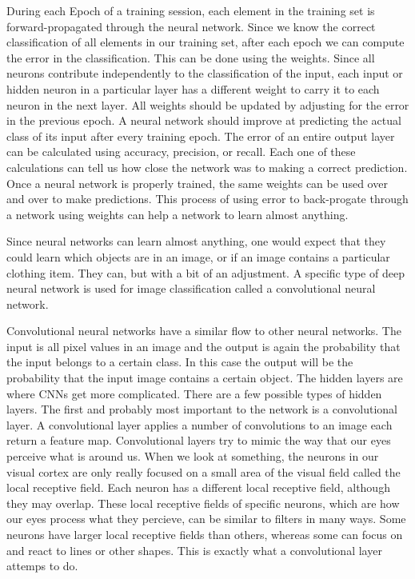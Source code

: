 \documentclass[12pt]{report} %
\begin{document}
	During each Epoch of a training session, each element in the training set is forward-propagated through the neural network. Since we know the correct classification of all elements in our training set, after each epoch we can compute the error in the classification. This can be done using the weights. Since all neurons contribute independently to the classification of the input, each input or hidden neuron in a particular layer has a different weight to carry it to each neuron in the next layer. All weights should be updated by adjusting for the error in the previous epoch. A neural network should improve at predicting the actual class of its input after every training epoch. The error of an entire output layer can be calculated using accuracy, precision, or recall. Each one of these calculations can tell us how close the network was to making a correct prediction. Once a neural network is properly trained, the same weights can be used over and over to make predictions. This process of using error to back-progate through a network using weights can help a network to learn almost anything.\cite{KubatMachineLearn} 
	
	Since neural networks can learn almost anything, one would expect that they could learn which objects are in an image, or if an image contains a particular clothing item. They can, but with a bit of an adjustment. A specific type of deep neural network is used for image classification called a convolutional neural network. 

	Convolutional neural networks have a similar flow to other neural networks. The input is all pixel values in an image and the output is again the probability that the input belongs to a certain class. In this case the output will be the probability that the input image contains a certain object. The hidden layers are where CNNs get more complicated. There are a few possible types of hidden layers. The first and probably most important to the network is a convolutional layer. A convolutional layer applies a number of convolutions to an image each return a feature map\cite{aurelienMachineLearning}. 
	Convolutional layers try to mimic the way that our eyes perceive what is around us. When we look at something, the neurons in our visual cortex are only really focused on a small area of the visual field called the local receptive field. Each neuron has a different local receptive field, although they may overlap. These local receptive fields of specific neurons, which are how our eyes process what they percieve, can be similar to filters in many ways. Some neurons have larger local receptive fields than others, whereas some can focus on and react to lines or other shapes. This is exactly what a convolutional layer attemps to do.\cite{aurelienMachineLearning} 
	
\end{document}
